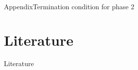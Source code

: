 \documentclass[aspectratio=169, hyperref={colorlinks=true, allcolors=SecondaryColor}, c]{beamer}
\begin{document}
\begin{frame}[fragile]{Appendix}{Termination condition for phase 2}
\end{frame}

\section{Literature}

\begin{frame}[allowframebreaks]{Literature}
	\printbibliography
\end{frame}
%
%


\end{document}
